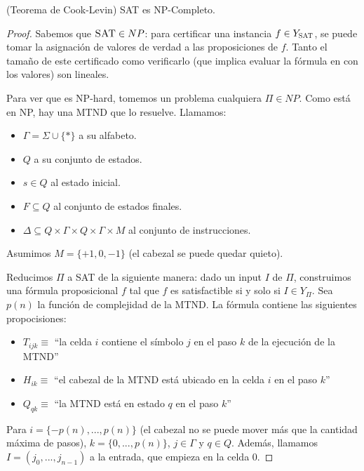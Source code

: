 \begin{theorem*}
    (Teorema de Cook-Levin) SAT es NP-Completo.
\end{theorem*}
\begin{proof}
    Sabemos que $\textsc{SAT} \in NP$: para certificar una instancia $f \in Y_{\textsc{SAT}}$, se puede tomar la asignación de valores de verdad a las proposiciones de $f$. Tanto el tamaño de este certificado como verificarlo (que implica evaluar la fórmula en con los valores) son lineales.

    Para ver que es NP-hard, tomemos un problema cualquiera $\Pi \in NP$. Como está en NP, hay una MTND que lo resuelve. Llamamos:
    \begin{itemize}
        \item $\Gamma = \Sigma \cup \{\ast\}$ a su alfabeto.
        \item $Q$ a su conjunto de estados.
        \item $s \in Q$ al estado inicial.
        \item $F \subseteq Q$ al conjunto de estados finales.
        \item $\Delta \subseteq Q \times \Gamma \times Q \times \Gamma \times M$ al conjunto de instrucciones.
    \end{itemize}

    Asumimos $M = \{+1, 0, -1\}$ (el cabezal se puede quedar quieto).

    Reducimos $\Pi$ a SAT de la siguiente manera: dado un input $I$ de $\Pi$, construimos una fórmula proposicional $f$ tal que $f$ es satisfactible si y solo si $I \in Y_{\Pi}$. Sea $p(n)$ la función de complejidad de la MTND. La fórmula contiene las siguientes propocisiones:
    \begin{itemize}
        \item $T_{ijk} \equiv $ ``la celda $i$ contiene el símbolo $j$ en el paso $k$ de la ejecución de la MTND''
        \item $H_{ik} \equiv $ ``el cabezal de la MTND está ubicado en la celda $i$ en el paso $k$''
        \item $Q_{qk} \equiv $ ``la MTND está en estado $q$ en el paso $k$''
    \end{itemize}

    Para $i = \{-p(n), ..., p(n)\}$ (el cabezal no se puede mover más que la cantidad máxima de pasos), $k = \{0, ..., p(n)\}$, $j \in \Gamma$ y $q \in Q$. Además, llamamos $I = (j_0, ..., j_{n - 1})$ a la entrada, que empieza en la celda $0$.


\end{proof}
